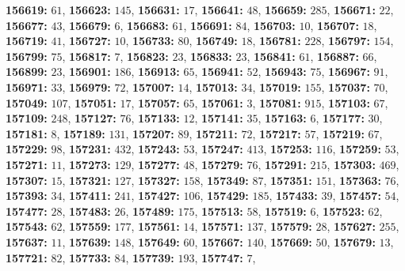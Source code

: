 \textsf{\bfseries 156619:} $61$, \textsf{\bfseries 156623:} $145$, \textsf{\bfseries 156631:} $17$, \textsf{\bfseries 156641:} $48$, \textsf{\bfseries 156659:} $285$, \textsf{\bfseries 156671:} $22$, \textsf{\bfseries 156677:} $43$, \textsf{\bfseries 156679:} $6$, \textsf{\bfseries 156683:} $61$, \textsf{\bfseries 156691:} $84$, \textsf{\bfseries 156703:} $10$, \textsf{\bfseries 156707:} $18$, \textsf{\bfseries 156719:} $41$, \textsf{\bfseries 156727:} $10$, \textsf{\bfseries 156733:} $80$, \textsf{\bfseries 156749:} $18$, \textsf{\bfseries 156781:} $228$, \textsf{\bfseries 156797:} $154$, \textsf{\bfseries 156799:} $75$, \textsf{\bfseries 156817:} $7$, \textsf{\bfseries 156823:} $23$, \textsf{\bfseries 156833:} $23$, \textsf{\bfseries 156841:} $61$, \textsf{\bfseries 156887:} $66$, \textsf{\bfseries 156899:} $23$, \textsf{\bfseries 156901:} $186$, \textsf{\bfseries 156913:} $65$, \textsf{\bfseries 156941:} $52$, \textsf{\bfseries 156943:} $75$, \textsf{\bfseries 156967:} $91$, \textsf{\bfseries 156971:} $33$, \textsf{\bfseries 156979:} $72$, \textsf{\bfseries 157007:} $14$, \textsf{\bfseries 157013:} $34$, \textsf{\bfseries 157019:} $155$, \textsf{\bfseries 157037:} $70$, \textsf{\bfseries 157049:} $107$, \textsf{\bfseries 157051:} $17$, \textsf{\bfseries 157057:} $65$, \textsf{\bfseries 157061:} $3$, \textsf{\bfseries 157081:} $915$, \textsf{\bfseries 157103:} $67$, \textsf{\bfseries 157109:} $248$, \textsf{\bfseries 157127:} $76$, \textsf{\bfseries 157133:} $12$, \textsf{\bfseries 157141:} $35$, \textsf{\bfseries 157163:} $6$, \textsf{\bfseries 157177:} $30$, \textsf{\bfseries 157181:} $8$, \textsf{\bfseries 157189:} $131$, \textsf{\bfseries 157207:} $89$, \textsf{\bfseries 157211:} $72$, \textsf{\bfseries 157217:} $57$, \textsf{\bfseries 157219:} $67$, \textsf{\bfseries 157229:} $98$, \textsf{\bfseries 157231:} $432$, \textsf{\bfseries 157243:} $53$, \textsf{\bfseries 157247:} $413$, \textsf{\bfseries 157253:} $116$, \textsf{\bfseries 157259:} $53$, \textsf{\bfseries 157271:} $11$, \textsf{\bfseries 157273:} $129$, \textsf{\bfseries 157277:} $48$, \textsf{\bfseries 157279:} $76$, \textsf{\bfseries 157291:} $215$, \textsf{\bfseries 157303:} $469$, \textsf{\bfseries 157307:} $15$, \textsf{\bfseries 157321:} $127$, \textsf{\bfseries 157327:} $158$, \textsf{\bfseries 157349:} $87$, \textsf{\bfseries 157351:} $151$, \textsf{\bfseries 157363:} $76$, \textsf{\bfseries 157393:} $34$, \textsf{\bfseries 157411:} $241$, \textsf{\bfseries 157427:} $106$, \textsf{\bfseries 157429:} $185$, \textsf{\bfseries 157433:} $39$, \textsf{\bfseries 157457:} $54$, \textsf{\bfseries 157477:} $28$, \textsf{\bfseries 157483:} $26$, \textsf{\bfseries 157489:} $175$, \textsf{\bfseries 157513:} $58$, \textsf{\bfseries 157519:} $6$, \textsf{\bfseries 157523:} $62$, \textsf{\bfseries 157543:} $62$, \textsf{\bfseries 157559:} $177$, \textsf{\bfseries 157561:} $14$, \textsf{\bfseries 157571:} $137$, \textsf{\bfseries 157579:} $28$, \textsf{\bfseries 157627:} $255$, \textsf{\bfseries 157637:} $11$, \textsf{\bfseries 157639:} $148$, \textsf{\bfseries 157649:} $60$, \textsf{\bfseries 157667:} $140$, \textsf{\bfseries 157669:} $50$, \textsf{\bfseries 157679:} $13$, \textsf{\bfseries 157721:} $82$, \textsf{\bfseries 157733:} $84$, \textsf{\bfseries 157739:} $193$, \textsf{\bfseries 157747:} $7$, 
